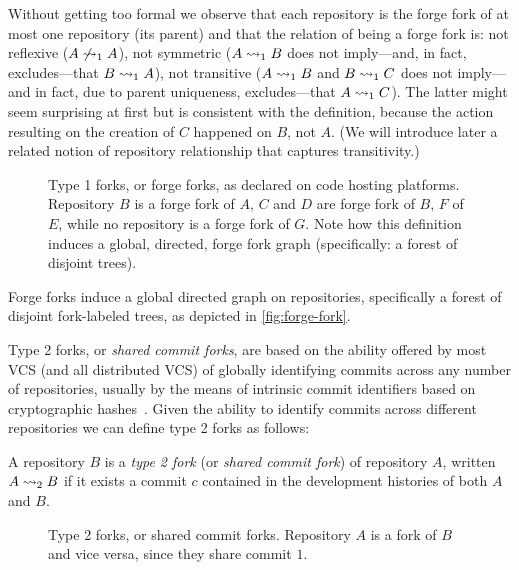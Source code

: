 \vspace{1em}

Without getting too formal we observe that each repository is the forge fork of
at most one repository (its parent) and that the relation of being a forge fork
is: not reflexive ($A\not\rightsquigarrow_1 A$), not symmetric ($A\rightsquigarrow_1 B$ does not
imply---and, in fact, excludes---that $B\rightsquigarrow_1 A$), not transitive
($A\rightsquigarrow_1 B$ and $B\rightsquigarrow_1 C$ does not imply---and in fact, due to parent
uniqueness, excludes---that $A\rightsquigarrow_1 C$).  The latter might seem surprising
at first but is consistent with the definition, because the action resulting on
the creation of $C$ happened on $B$, not $A$.  (We will introduce later a
related notion of repository relationship that captures transitivity.)

\begin{figure}[t]
  \centering
  
  \caption{Type 1 forks, or forge forks, as declared on code hosting platforms.
    Repository $B$ is a forge fork of $A$, $C$ and $D$ are forge fork of $B$,
    $F$ of $E$, while no repository is a forge fork of $G$. Note how this
    definition induces a global, directed, forge fork graph (specifically: a
    forest of disjoint trees).
    }%
  \label{fig:forge-fork}%
  \label{fig:type1-fork}
\end{figure}

Forge forks induce a global directed graph on repositories, specifically a
forest of disjoint fork-labeled trees, as depicted in \cref{fig:forge-fork}.

Type 2 forks, or \emph{shared commit forks}, are based on the ability offered
by most VCS (and all distributed VCS) of globally identifying commits across
any number of repositories, usually by the means of intrinsic commit
identifiers based on cryptographic hashes~\cite{spinellis2005vcs,
  swhipres2018}. Given the ability to identify commits across different
repositories we can define type 2 forks as follows:
\begin{definition}%
  \label{def:commit-fork}%
  \label{def:type2-fork}
  A repository $B$ is a \emph{type 2 fork} (or \emph{shared commit fork}) of
  repository $A$, written $A\rightsquigarrow_2 B$ if it exists a commit $c$ contained in
  the development histories of both $A$ and $B$.
\end{definition}

\begin{figure}[t]
  \centering
  
  \caption{Type 2 forks, or shared commit forks. Repository $A$ is a fork of
    $B$ and vice versa, since they share commit $1$.}%
  \label{fig:commit-fork}%
  \label{fig:type2-fork}
\end{figure}

